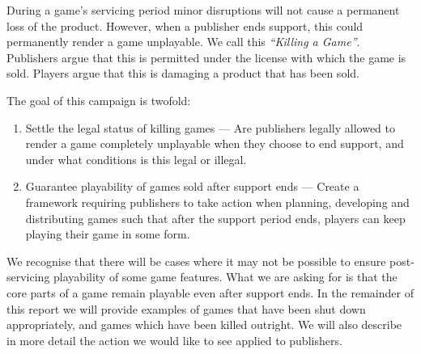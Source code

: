 
During a game's servicing period
minor disruptions will not cause a permanent loss of the product.
However, when a publisher ends support, this could permanently render a game unplayable.
We call this \emph{``Killing a Game''}.
Publishers argue that this is permitted under the license with which the game is sold.
Players argue that this is damaging a product that has been sold.

The goal of this campaign is twofold:
\begin{enumerate}
    \item Settle the legal status of killing games ---
    Are publishers legally allowed to render a game completely unplayable when they choose to end support, and under what conditions is this legal or illegal.
    \item Guarantee playability of games sold after support ends ---
    Create a framework requiring publishers to take action when planning, developing and distributing games such that after the support period ends,
    players can keep playing their game in some form.
\end{enumerate}

We recognise that there will be cases where it may not be possible to ensure post-servicing playability of some game features.
What we are asking for is that the core parts of a game remain playable even after support ends.
In the remainder of this report we will provide examples of games that have been shut down appropriately, and games which have been killed outright.
We will also describe in more detail the action we would like to see applied to publishers.


